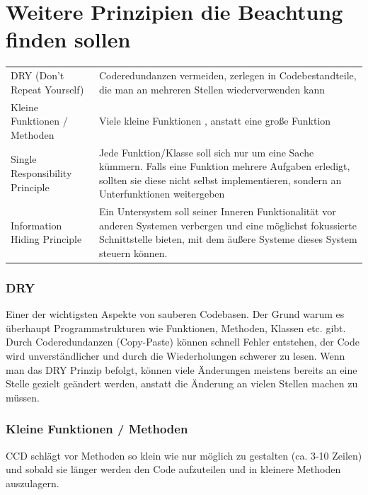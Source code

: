 
\section{Weitere Prinzipien die Beachtung finden sollen}

\bigskip
\begin{tabularx}{\textwidth}{p{160 pt}|X}
DRY  (Don't Repeat Yourself) & Coderedundanzen vermeiden, zerlegen in Codebestandteile, die man an mehreren Stellen wiederverwenden kann \\
Kleine Funktionen / Methoden & Viele kleine Funktionen , anstatt eine große Funktion \\
Single Responsibility Principle & Jede Funktion/Klasse soll sich nur um eine Sache kümmern. Falls eine Funktion mehrere 
Aufgaben erledigt, sollten sie diese nicht selbst implementieren, sondern an Unterfunktionen weitergeben \\
Information Hiding Principle & Ein Untersystem soll seiner Inneren Funktionalität vor anderen Systemen verbergen und eine möglichst fokussierte Schnittstelle bieten, mit dem äußere Systeme dieses System steuern können. \\
\end{tabularx}


\subsubsection{DRY}

Einer der wichtigsten Aspekte von sauberen Codebasen. Der Grund warum es überhaupt 
Programmstrukturen wie Funktionen, Methoden, Klassen etc. gibt.
Durch Coderedundanzen (Copy-Paste) können schnell Fehler entstehen, der Code
wird unverständlicher und durch die Wiederholungen schwerer zu lesen.
Wenn man das DRY Prinzip befolgt, können viele Änderungen meistens bereits an
eine Stelle gezielt geändert werden, anstatt die Änderung an vielen Stellen
machen zu müssen.

\subsubsection{Kleine Funktionen / Methoden}

CCD schlägt vor Methoden so klein wie nur möglich zu gestalten (ca. 3-10 Zeilen) und sobald 
sie länger werden den Code aufzuteilen und in kleinere Methoden auszulagern.

